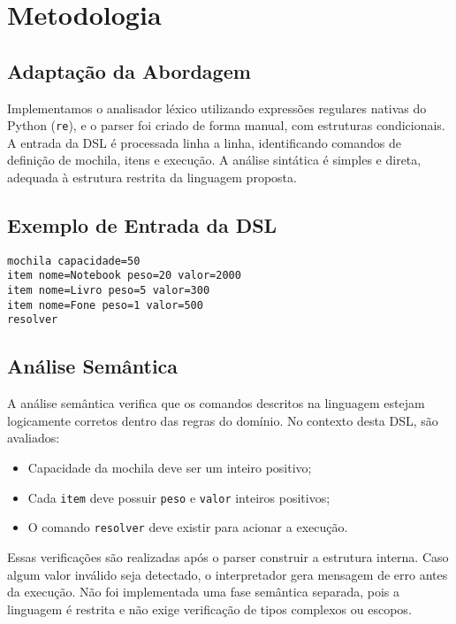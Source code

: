 \documentclass[conference]{IEEEtran}
\begin{document}
\section{Metodologia}

\subsection{Adaptação da Abordagem}
Implementamos o analisador léxico utilizando expressões regulares nativas do Python (\texttt{re}), e o parser foi criado de forma manual, com estruturas condicionais. A entrada da DSL é processada linha a linha, identificando comandos de definição de mochila, itens e execução. A análise sintática é simples e direta, adequada à estrutura restrita da linguagem proposta.

\subsection{Exemplo de Entrada da DSL}
\begin{lstlisting}
mochila capacidade=50
item nome=Notebook peso=20 valor=2000
item nome=Livro peso=5 valor=300
item nome=Fone peso=1 valor=500
resolver
\end{lstlisting}

\subsection{Análise Semântica}
A análise semântica verifica que os comandos descritos na linguagem estejam logicamente corretos dentro das regras do domínio. No contexto desta DSL, são avaliados:
\begin{itemize}
    \item Capacidade da mochila deve ser um inteiro positivo;
    \item Cada \texttt{item} deve possuir \texttt{peso} e \texttt{valor} inteiros positivos;
    \item O comando \texttt{resolver} deve existir para acionar a execução.
\end{itemize}
Essas verificações são realizadas após o parser construir a estrutura interna. Caso algum valor inválido seja detectado, o interpretador gera mensagem de erro antes da execução. Não foi implementada uma fase semântica separada, pois a linguagem é restrita e não exige verificação de tipos complexos ou escopos.
\end{document}
